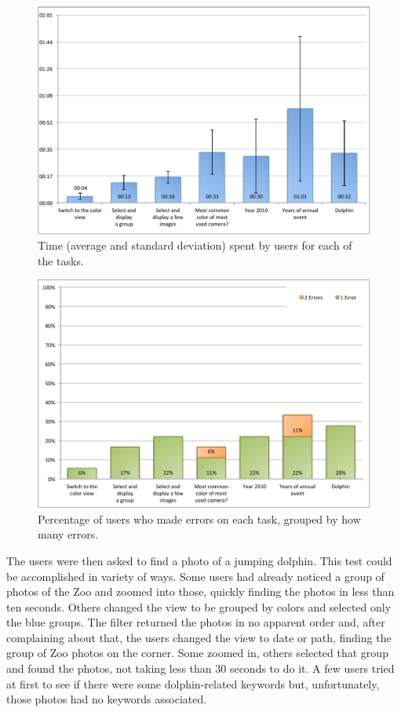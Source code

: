{\begin{figure}[p]
	\centering
		\includegraphics[width=0.9\linewidth]{../Figures/tasks-graphs-time}
	\caption[Graph of time spent on each task]{Time (average and standard deviation) spent by users for each of the tasks.}
	\label{fig:tasks:graph:time}
\end{figure}

\begin{figure}[p]
	\centering
		\includegraphics[width=0.9\linewidth]{../Figures/tasks-graphs-errors}
	\caption[Graph of errors made on each task]{Percentage of users who made errors on each task, grouped by how many errors.}
	\label{fig:tasks:graph:errors}
\end{figure}

The users were then asked to find a photo of a jumping dolphin. This test could be accomplished in variety of ways. Some users had already noticed a group of photos of the Zoo and zoomed into those, quickly finding the photos in less than ten seconds. Others changed the view to be grouped by colors and selected only the blue groups. The filter returned the photos in no apparent order and, after complaining about that, the users changed the view to date or path, finding the group of Zoo photos on the corner. Some zoomed in, others selected that group and found the photos, not taking less than 30 seconds to do it. A few users tried at first to see if there were some dolphin-related keywords but, unfortunately, those photos had no keywords associated.








}
